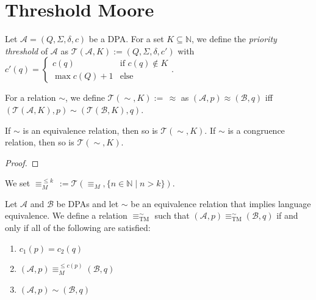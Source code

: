 \section{Threshold Moore}
\begin{defn}
	Let $\mathcal{A} = (Q, \Sigma, \delta, c)$ be a DPA. For a set $K \subseteq \mathbb{N}$, we define the \emph{priority threshold} of $\mathcal{A}$ as $\mathcal{T}(\mathcal{A}, K) := (Q, \Sigma, \delta, c')$ with $c'(q) = \begin{cases} c(q) & \text{if } c(q) \notin K \\ \max c(Q) + 1 & \text{else} \end{cases}$.
	
	For a relation $\sim$, we define $\mathcal{T}(\sim, K) :=\, \approx$ as $(\mathcal{A}, p) \approx (\mathcal{B}, q)$ iff $(\mathcal{T}(\mathcal{A}, K), p) \sim (\mathcal{T}(\mathcal{B}, K), q)$.
\end{defn}

\begin{lem}
	If $\sim$ is an equivalence relation, then so is $\mathcal{T}(\sim, K)$. If $\sim$ is a congruence relation, then so is $\mathcal{T}(\sim, K)$.
\end{lem}

\begin{proof}
\end{proof}

\begin{defn}
	We set $\equiv_M^{\leq k} \,:= \mathcal{T}(\equiv_M, \{ n \in \mathbb{N} \mid n > k \})$.
\end{defn}

\vspace{5pt}

\begin{defn}
	Let $\mathcal{A}$ and $\mathcal{B}$ be DPAs and let $\sim$ be an equivalence relation that implies language equivalence. We define a relation $\equiv_\text{TM}^\sim$ such that $(\mathcal{A}, p) \equiv^\sim_\text{TM} (\mathcal{B}, q)$ if and only if all of the following are satisfied:
	\begin{enumerate}
		\item $c_1(p) = c_2(q)$
		\item $(\mathcal{A}, p) \equiv_M^{\leq c(p)} (\mathcal{B}, q)$
		\item $(\mathcal{A}, p) \sim (\mathcal{B}, q)$
	\end{enumerate}
\end{defn}


